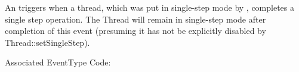 
An  triggers when a thread, which was put in single-step
mode by , completes a single step operation.
The Thread will remain in single-step mode after completion of this event
(presuming it has not be explicitly disabled by Thread::setSingleStep).

Associated EventType Code: 
